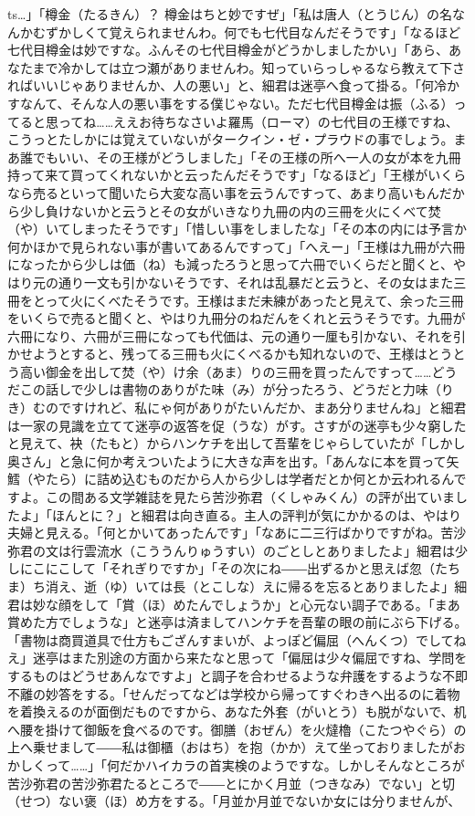 \documentclass{book}
\begin{document}
ts{}\ldots{}」「樽金（たるきん）？ 樽金はちと妙ですぜ」「私は唐人（とうじん）の名なんかむずかしくて覚えられませんわ。何でも七代目なんだそうです」「なるほど七代目樽金は妙ですな。ふんその七代目樽金がどうかしましたかい」「あら、あなたまで冷かしては立つ瀬がありませんわ。知っていらっしゃるなら教えて下さればいいじゃありませんか、人の悪い」と、細君は迷亭へ食って掛る。「何冷かすなんて、そんな人の悪い事をする僕じゃない。ただ七代目樽金は振（ふる）ってると思ってね\ldots{}\ldots{}ええお待ちなさいよ羅馬（ローマ）の七代目の王様ですね、こうっとたしかには覚えていないがタークイン・ゼ・プラウドの事でしょう。まあ誰でもいい、その王様がどうしました」「その王様の所へ一人の女が本を九冊持って来て買ってくれないかと云ったんだそうです」「なるほど」「王様がいくらなら売るといって聞いたら大変な高い事を云うんですって、あまり高いもんだから少し負けないかと云うとその女がいきなり九冊の内の三冊を火にくべて焚（や）いてしまったそうです」「惜しい事をしましたな」「その本の内には予言か何かほかで見られない事が書いてあるんですって」「へえー」「王様は九冊が六冊になったから少しは価（ね）も減ったろうと思って六冊でいくらだと聞くと、やはり元の通り一文も引かないそうです、それは乱暴だと云うと、その女はまた三冊をとって火にくべたそうです。王様はまだ未練があったと見えて、余った三冊をいくらで売ると聞くと、やはり九冊分のねだんをくれと云うそうです。九冊が六冊になり、六冊が三冊になっても代価は、元の通り一厘も引かない、それを引かせようとすると、残ってる三冊も火にくべるかも知れないので、王様はとうとう高い御金を出して焚（や）け余（あま）りの三冊を買ったんですって\ldots{}\ldots{}どうだこの話しで少しは書物のありがた味（み）が分ったろう、どうだと力味（りき）むのですけれど、私にゃ何がありがたいんだか、まあ分りませんね」と細君は一家の見識を立てて迷亭の返答を促（うな）がす。さすがの迷亭も少々窮したと見えて、袂（たもと）からハンケチを出して吾輩をじゃらしていたが「しかし奥さん」と急に何か考えついたように大きな声を出す。「あんなに本を買って矢鱈（やたら）に詰め込むものだから人から少しは学者だとか何とか云われるんですよ。この間ある文学雑誌を見たら苦沙弥君（くしゃみくん）の評が出ていましたよ」「ほんとに？」と細君は向き直る。主人の評判が気にかかるのは、やはり夫婦と見える。「何とかいてあったんです」「なあに二三行ばかりですがね。苦沙弥君の文は行雲流水（こううんりゅうすい）のごとしとありましたよ」細君は少しにこにこして「それぎりですか」「その次にね――出ずるかと思えば忽（たちま）ち消え、逝（ゆ）いては長（とこしな）えに帰るを忘るとありましたよ」細君は妙な顔をして「賞（ほ）めたんでしょうか」と心元ない調子である。「まあ賞めた方でしょうな」と迷亭は済ましてハンケチを吾輩の眼の前にぶら下げる。「書物は商買道具で仕方もござんすまいが、よっぽど偏屈（へんくつ）でしてねえ」迷亭はまた別途の方面から来たなと思って「偏屈は少々偏屈ですね、学問をするものはどうせあんなですよ」と調子を合わせるような弁護をするような不即不離の妙答をする。「せんだってなどは学校から帰ってすぐわきへ出るのに着物を着換えるのが面倒だものですから、あなた外套（がいとう）も脱がないで、机へ腰を掛けて御飯を食べるのです。御膳（おぜん）を火燵櫓（こたつやぐら）の上へ乗せまして――私は御櫃（おはち）を抱（かか）えて坐っておりましたがおかしくって\ldots{}\ldots{}」「何だかハイカラの首実検のようですな。しかしそんなところが苦沙弥君の苦沙弥君たるところで――とにかく月並（つきなみ）でない」と切（せつ）ない褒（ほ）め方をする。「月並か月並でないか女には分りませんが、
\end{document}
